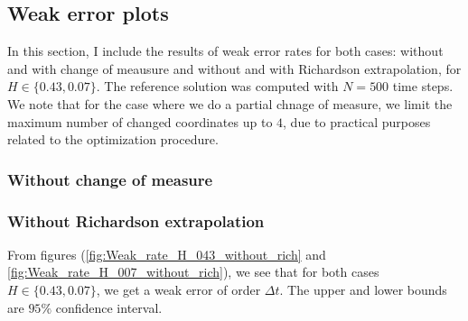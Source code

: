 \documentclass[11pt]{article}
\begin{document}
\newpage

\subsection{Weak error plots} \label{sec:Weak error plots}
In this section, I include the results of weak error rates for both cases: without and with change of meausure and  without and with Richardson extrapolation,  for $H \in \{0.43,0.07\}$. The reference solution was computed with $N=500$ time steps. We note that for the case where we do a partial chnage of measure, we limit the maximum number of changed coordinates  up to $4$, due to practical purposes related to the optimization procedure.
 
\newpage
\subsubsection{Without change of measure}
\subsubsection*{Without Richardson extrapolation}
From figures (\ref{fig:Weak_rate_H_043_without_rich} and \ref{fig:Weak_rate_H_007_without_rich}), we see that for both cases $H \in \{0.43,0.07\}$, we get a weak error of order $\Delta t$. The upper and lower bounds are $95\%$ confidence interval.
\end{document}

